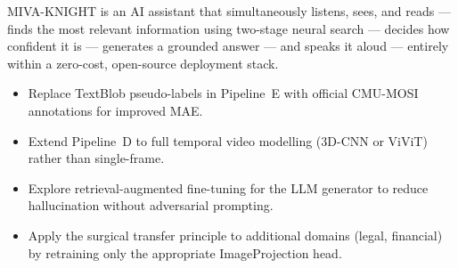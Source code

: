 \documentclass[12pt,a4paper]{article}
\theoremstyle{definition}
\theoremstyle{plain}
\theoremstyle{remark}
\begin{document}
\begin{tcolorbox}[laymanbox,title={One-Sentence Summary}]
MIVA-KNIGHT is an AI assistant that simultaneously listens, sees, and reads — finds the most relevant information using two-stage neural search — decides how confident it is — generates a grounded answer — and speaks it aloud — entirely within a zero-cost, open-source deployment stack.
\end{tcolorbox}

\vfill
\begin{center}
\begin{tcolorbox}[keybox,width=0.8\textwidth,title={Future Directions}]
\begin{itemize}[nosep]
  \item Replace TextBlob pseudo-labels in Pipeline~E with official CMU-MOSI annotations for improved MAE.
  \item Extend Pipeline~D to full temporal video modelling (3D-CNN or ViViT) rather than single-frame.
  \item Explore retrieval-augmented fine-tuning for the LLM generator to reduce hallucination without adversarial prompting.
  \item Apply the surgical transfer principle to additional domains (legal, financial) by retraining only the appropriate ImageProjection head.
\end{itemize}
\end{tcolorbox}
\end{center}
\end{document}
